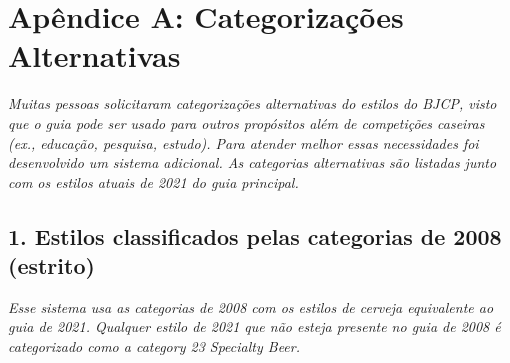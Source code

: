 \clearpage
{}
\divisorLine
\section*{Apêndice A: Categorizações Alternativas}

\textit{Muitas pessoas solicitaram categorizações alternativas do estilos do BJCP, visto que o guia pode ser usado para outros propósitos além de competições caseiras (ex., educação, pesquisa, estudo). Para atender melhor essas necessidades foi desenvolvido um sistema adicional. As categorias alternativas são listadas junto com os estilos atuais de 2021 do guia principal.}

\begin{multicols*}{2}

\subsection*{1. Estilos classificados pelas categorias de 2008 (estrito)}

\textit{Esse sistema usa as categorias de 2008 com os estilos de cerveja equivalente ao guia de 2021. Qualquer estilo de 2021 que não esteja presente no guia de 2008 é categorizado como a category 23 Specialty Beer.}


\end{multicols*}
